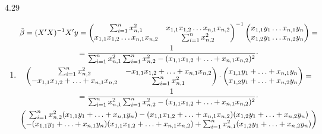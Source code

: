 \begin{solution}{{4.29}}
\begin{enumerate}
\item
\begin{multline*}
\hat{\beta}=(X'X)^{-1}X'y=
\begin{pmatrix}
\sum_{i=1}^n x^2_{n,1}& x_{1,1}x_{1,2}\ldots x_{n,1}x_{n,2}\\
x_{1,1}x_{1,2}\ldots x_{n,1}x_{n,2}&\sum_{i=1}^nx^2_{n,2}
\end{pmatrix}^{-1}
\begin{pmatrix}
x_{1,1}y_1\ldots x_{n,1}y_n\\
x_{1,2}y_1\ldots x_{n,2}y_n
\end{pmatrix}=\\
=\frac{1}{\sum_{i=1}^n x^2_{n,1}\sum_{i=1}^n x^2_{n,2}-(x_{1,1}x_{1,2}+\ldots+ x_{n,1}x_{n,2})^2}\cdot\\
\begin{pmatrix}
\sum_{i=1}^n x^2_{n,2}& -x_{1,1}x_{1,2}+\ldots+ x_{n,1}x_{n,2}\\
-x_{1,1}x_{1,2}+\ldots +x_{n,1}x_{n,2}&\sum_{i=1}^nx^2_{n,1}
\end{pmatrix}
\cdot
\begin{pmatrix}
x_{1,1}y_1+\ldots +x_{n,1}y_n\\
x_{1,2}y_1+\ldots +x_{n,2}y_n
\end{pmatrix}=\\
=\frac{1}{\sum_{i=1}^n x^2_{n,1}\sum_{i=1}^n x^2_{n,2}-(x_{1,1}x_{1,2}+\ldots+ x_{n,1}x_{n,2})^2}\cdot\\
\begin{pmatrix}
\sum_{i=1}^n x^2_{n,2}(x_{1,1}y_1+\ldots +x_{n,1}y_n) -(x_{1,1}x_{1,2}+\ldots+ x_{n,1}x_{n,2})(x_{1,2}y_1+\ldots +x_{n,2}y_n)\\
-(x_{1,1}y_1+\ldots +x_{n,1}y_n)(x_{1,1}x_{1,2}+\ldots +x_{n,1}x_{n,2})+\sum_{i=1}^nx^2_{n,1}(x_{1,2}y_1+\ldots +x_{n,2}y_n)
\end{pmatrix}
\end{multline*}
\end{enumerate}
\end{solution}
\protect \hypertarget {soln:4.30}{}
